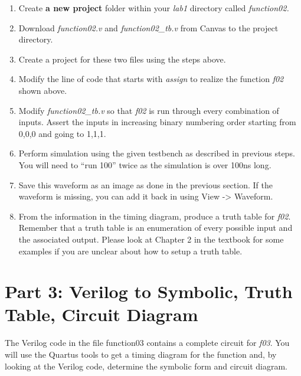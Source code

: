 \documentclass[
]{article}
\begin{document}
\begin{enumerate}
\def\labelenumi{\arabic{enumi}.}
\item
  Create \textbf{a new project} folder within your \emph{lab1} directory
  called \emph{function02.}
\item
  Download \emph{function02.v} and \emph{function02\_tb.v} from Canvas
  to the project directory.
\item
  Create a project for these two files using the steps above.
\item
  Modify the line of code that starts with \emph{assign} to realize the
  function \emph{f02} shown above.
\item
  Modify \emph{function02\_tb.v} so that \emph{f02} is run through every
  combination of inputs. Assert the inputs in increasing binary
  numbering order starting from 0,0,0 and going to 1,1,1.
\item
  Perform simulation using the given testbench as described in previous
  steps. You will need to ``run 100'' twice as the simulation is over
  100ns long.
\item
  Save this waveform as an image as done in the previous section. If the
  waveform is missing, you can add it back in using View -\textgreater{}
  Waveform.
\item
  From the information in the timing diagram, produce a truth table for
  \emph{f02}. Remember that a truth table is an enumeration of every
  possible input and the associated output. Please look at Chapter 2 in
  the textbook for some examples if you are unclear about how to setup a
  truth table.
\end{enumerate}

\hypertarget{section-1}{%
\section{}\label{section-1}}

\hypertarget{part-3-verilog-to-symbolic-truth-table-circuit-diagram}{%
\section{Part 3: Verilog to Symbolic, Truth Table, Circuit
Diagram}\label{part-3-verilog-to-symbolic-truth-table-circuit-diagram}}

The Verilog code in the file function03 contains a complete circuit for
\emph{f03}. You will use the Quartus tools to get a timing diagram for
the function and, by looking at the Verilog code, determine the symbolic
form and circuit diagram.
\end{document}
